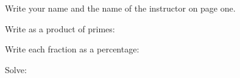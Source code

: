 \documentclass[11pt]{exam}
\begin{document}
\begin{questions}


\addpoints
\question[5] Write your name and the name of the instructor on page one. 

\addpoints
\question Write as a product of primes:

\addpoints
\question Write each fraction as a percentage:


\newpage
\addpoints
\question Solve:


\end{questions}
\end{document}
